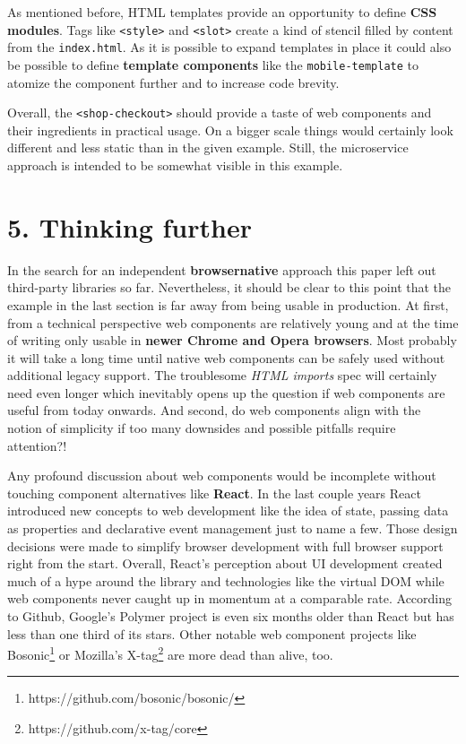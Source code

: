 \documentclass[]{article}
\begin{document}
As mentioned before, HTML templates provide an opportunity to define
\textbf{CSS modules}. Tags like \texttt{\textless{}style\textgreater{}}
and \texttt{\textless{}slot\textgreater{}} create a kind of stencil
filled by content from the \texttt{index.html}. As it is possible to
expand templates in place it could also be possible to define
\textbf{template components} like the \texttt{mobile-template} to
atomize the component further and to increase code brevity.

Overall, the \texttt{\textless{}shop-checkout\textgreater{}} should
provide a taste of web components and their ingredients in practical
usage. On a bigger scale things would certainly look different and less
static than in the given example. Still, the microservice approach is
intended to be somewhat visible in this example.

\section{5. Thinking further}\label{thinking-further}

In the search for an independent \textbf{browsernative} approach this
paper left out third-party libraries so far. Nevertheless, it should be
clear to this point that the example in the last section is far away
from being usable in production. At first, from a technical perspective
web components are relatively young and at the time of writing only
usable in \textbf{newer Chrome and Opera browsers}. Most probably it
will take a long time until native web components can be safely used
without additional legacy support. The troublesome \emph{HTML imports}
spec will certainly need even longer which inevitably opens up the
question if web components are useful from today onwards. And second, do
web components align with the notion of simplicity if too many downsides
and possible pitfalls require attention?!

Any profound discussion about web components would be incomplete without
touching component alternatives like \textbf{React}. In the last couple
years React introduced new concepts to web development like the idea of
state, passing data as properties and declarative event management just
to name a few. Those design decisions were made to simplify browser
development with full browser support right from the start. Overall,
React's perception about UI development created much of a hype around
the library and technologies like the virtual DOM while web components
never caught up in momentum at a comparable rate. According to Github,
Google's Polymer project is even six months older than React but has
less than one third of its stars. Other notable web component projects
like Bosonic\footnote{https://github.com/bosonic/bosonic/} or Mozilla's
X-tag\footnote{https://github.com/x-tag/core} are more dead than alive,
too.
\end{document}
